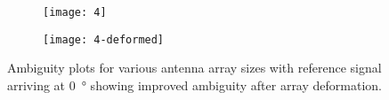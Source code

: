 \begin{figure}
  \centering
  \begin{subfigure}{\textwidth}
    \centering
    \texttt{[image: 4]}
  \end{subfigure}
  \begin{subfigure}{\textwidth}
    \centering
    \texttt{[image: 4-deformed]}
  \end{subfigure}
  \caption{Ambiguity plots for various antenna array sizes with reference signal arriving at \SI{0}{\degree} showing improved ambiguity after array deformation.}
\end{figure}
